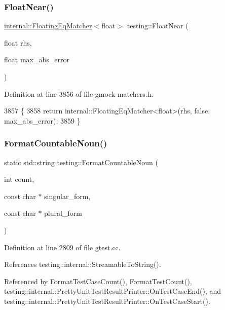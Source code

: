 \subsubsection{\texorpdfstring{Float\+Near()}{FloatNear()}}
{\footnotesize\ttfamily \hyperlink{classtesting_1_1internal_1_1FloatingEqMatcher}{internal\+::\+Floating\+Eq\+Matcher}$<$float$>$ testing\+::\+Float\+Near (\begin{DoxyParamCaption}\item[{float}]{rhs,  }\item[{float}]{max\+\_\+abs\+\_\+error }\end{DoxyParamCaption})\hspace{0.3cm}{\ttfamily [inline]}}



Definition at line 3856 of file gmock-\/matchers.\+h.


\begin{DoxyCode}
3857                                     \{
3858   \textcolor{keywordflow}{return} internal::FloatingEqMatcher<float>(rhs, \textcolor{keyword}{false}, max\_abs\_error);
3859 \}
\end{DoxyCode}
\mbox{\label{namespacetesting_a33e070c3e994cb75f9017fa2a044d536}} 
\subsubsection{\texorpdfstring{Format\+Countable\+Noun()}{FormatCountableNoun()}}
{\footnotesize\ttfamily static std\+::string testing\+::\+Format\+Countable\+Noun (\begin{DoxyParamCaption}\item[{int}]{count,  }\item[{const char $\ast$}]{singular\+\_\+form,  }\item[{const char $\ast$}]{plural\+\_\+form }\end{DoxyParamCaption})\hspace{0.3cm}{\ttfamily [static]}}



Definition at line 2809 of file gtest.\+cc.



References testing\+::internal\+::\+Streamable\+To\+String().



Referenced by Format\+Test\+Case\+Count(), Format\+Test\+Count(), testing\+::internal\+::\+Pretty\+Unit\+Test\+Result\+Printer\+::\+On\+Test\+Case\+End(), and testing\+::internal\+::\+Pretty\+Unit\+Test\+Result\+Printer\+::\+On\+Test\+Case\+Start().


